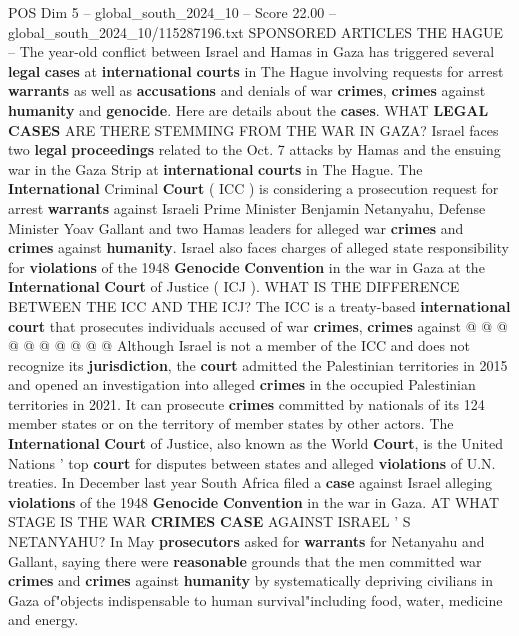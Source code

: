 \begin{textsample}{POS Dim 5 – global\_south\_2024\_10 – Score 22.00 – global\_south\_2024\_10/115287196.txt}  \label{ex:f5_pos_321}
SPONSORED ARTICLES THE HAGUE -- The year-old conflict between Israel and Hamas in Gaza has triggered several \textbf{legal} \textbf{cases} at \textbf{international} \textbf{courts} in The Hague involving requests for arrest \textbf{warrants} as well as \textbf{accusations} and denials of war \textbf{crimes}, \textbf{crimes} against \textbf{humanity} and \textbf{genocide}.
Here are details about the \textbf{cases}.
WHAT \textbf{LEGAL} \textbf{CASES} ARE THERE STEMMING FROM THE WAR IN GAZA?
Israel faces two \textbf{legal} \textbf{proceedings} related to the Oct. 7 attacks by Hamas and the ensuing war in the Gaza Strip at \textbf{international} \textbf{courts} in The Hague.
The \textbf{International} Criminal \textbf{Court} ( ICC ) is considering a prosecution request for arrest \textbf{warrants} against Israeli Prime Minister Benjamin Netanyahu, Defense Minister Yoav Gallant and two Hamas leaders for alleged war \textbf{crimes} and \textbf{crimes} against \textbf{humanity}.
Israel also faces charges of alleged state responsibility for \textbf{violations} of the 1948 \textbf{Genocide} \textbf{Convention} in the war in Gaza at the \textbf{International} \textbf{Court} of Justice ( ICJ ).
WHAT IS THE DIFFERENCE BETWEEN THE ICC AND THE ICJ?
The ICC is a treaty-based \textbf{international} \textbf{court} that prosecutes individuals accused of war \textbf{crimes}, \textbf{crimes} against @ @ @ @ @ @ @ @ @ @ Although Israel is not a member of the ICC and does not recognize its \textbf{jurisdiction}, the \textbf{court} admitted the Palestinian territories in 2015 and opened an investigation into alleged \textbf{crimes} in the occupied Palestinian territories in 2021.
It can prosecute \textbf{crimes} committed by nationals of its 124 member states or on the territory of member states by other actors.
The \textbf{International} \textbf{Court} of Justice, also known as the World \textbf{Court}, is the United Nations ' top \textbf{court} for disputes between states and alleged \textbf{violations} of U.N. treaties.
In December last year South Africa filed a \textbf{case} against Israel alleging \textbf{violations} of the 1948 \textbf{Genocide} \textbf{Convention} in the war in Gaza.
AT WHAT STAGE IS THE WAR \textbf{CRIMES} \textbf{CASE} AGAINST ISRAEL ' S NETANYAHU?
In May \textbf{prosecutors} asked for \textbf{warrants} for Netanyahu and Gallant, saying there were \textbf{reasonable} grounds that the men committed war \textbf{crimes} and \textbf{crimes} against \textbf{humanity} by systematically depriving civilians in Gaza of"objects indispensable to human survival"including food, water, medicine and energy.

\end{textsample}
